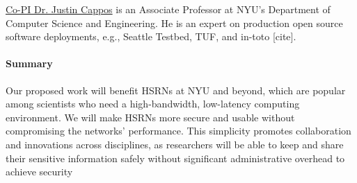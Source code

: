 \underline{Co-PI Dr. Justin Cappos} is an Associate Professor at NYU's Department of Computer Science and Engineering. He is an expert on production open source software deployments, e.g., Seattle Testbed, TUF, and in-toto [cite].

\paragraph{Summary}
Our proposed work will benefit HSRNs at NYU and beyond, which are popular among scientists who need a high-bandwidth, low-latency computing environment. We will make HSRNs more secure and usable without compromising the networks' performance. This simplicity promotes collaboration and innovations across disciplines, as researchers will be able to keep and share their sensitive information safely without significant administrative overhead to achieve security




